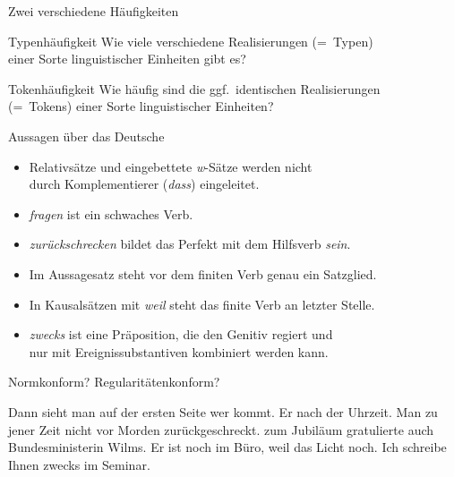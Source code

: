 \begin{frame}
  {Zwei verschiedene Häufigkeiten}
  \onslide<+->
  \onslide<+->
  \Large\begin{block}{Typenhäufigkeit}
    Wie viele \alert{verschiedene} Realisierungen (=~Typen)\\
    einer Sorte linguistischer Einheiten gibt es?
  \end{block}

  \onslide<+->
  \Zeile
  
  \begin{block}{Tokenhäufigkeit}
    Wie häufig sind die \alert{ggf.\ identischen} Realisierungen\\
    (=~Tokens) einer Sorte linguistischer Einheiten?
  \end{block}
\end{frame}

\begin{frame}
  {Aussagen über das Deutsche}
  \onslide<+->
  \begin{itemize}[<+->]
    \item Relativsätze und eingebettete \textit{w}-Sätze werden nicht\\
      durch Komplementierer (\textit{dass}) eingeleitet.
      \Viertelzeile
    \item \textit{fragen} ist ein schwaches Verb.
      \Viertelzeile
    \item \textit{zurückschrecken} bildet das Perfekt mit dem Hilfsverb \textit{sein}.
      \Viertelzeile
    \item Im Aussagesatz steht vor dem finiten Verb genau ein Satzglied.
      \Viertelzeile
    \item In Kausalsätzen mit \textit{weil} steht das finite Verb an letzter Stelle.
      \Viertelzeile
    \item \textit{zwecks} ist eine Präposition, die den Genitiv regiert und\\
      nur mit Ereignissubstantiven kombiniert werden kann.
  \end{itemize}
\end{frame}


\begin{frame}
  {Normkonform? Regularitätenkonform?}
  \onslide<+->
  \onslide<+->
  \begin{exe}
    \ex
    \begin{xlist}
      \ex Dann sieht man auf der ersten Seite \alert{wer}  kommt.
      \onslide<+->
      \Halbzeile
      \ex Er  nach der Uhrzeit.
      \onslide<+->
      \Halbzeile
      \ex Man  zu jener Zeit nicht vor Morden \alert{zurückgeschreckt}.
      \onslide<+->
      \Halbzeile
      \ex {} \alert{zum Jubiläum} gratulierte auch Bundesministerin Wilms.
      \onslide<+->
      \Halbzeile
      \ex Er ist noch im Büro, \alert{weil} das Licht  noch.
      \onslide<+->
      \Halbzeile
      \ex Ich schreibe Ihnen \alert{zwecks}  im Seminar.
    \end{xlist}
  \end{exe}
\end{frame}


